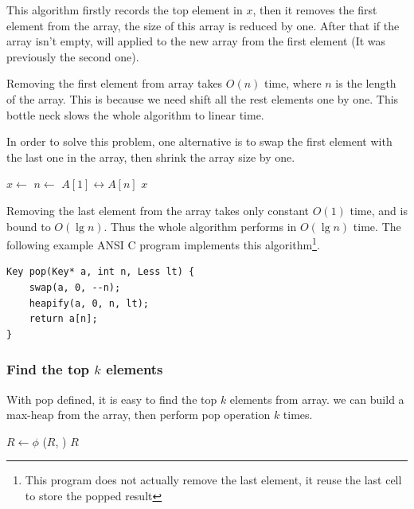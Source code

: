 \documentclass[b5paper]{article}
\begin{document}
This algorithm firstly records the top element in $x$, then
it removes the first element from the array, the size of
this array is reduced by one. After that if the array isn't
empty,  will applied to the new array from
the first element (It was previously the second one).

Removing the first element from array takes $O(n)$ time,
where $n$ is the length of the array. This is because
we need shift all the rest elements one by one.
This bottle neck slows the whole algorithm
to linear time.

In order to solve this problem, one alternative is
to swap the first element with the last one in the
array, then shrink the array size by one.

\begin{algorithmic}[1]
  \State $x \gets$ 
  \State $n \gets$ 
  \State {} $A[1] \leftrightarrow A[n]$
  \State {}
    \State {}
  \EndIf
  \State \Return $x$
\EndFunction
\end{algorithmic}

Removing the last element from the array takes
only constant $O(1)$ time, and  is bound to $O(\lg n)$.
Thus the whole algorithm performs in $O(\lg n)$ time. The following
example ANSI C program implements this algorithm\footnote{This program does not
actually remove the last element, it reuse the last cell to store the popped
result}.

\lstset{language=C}
\begin{lstlisting}
Key pop(Key* a, int n, Less lt) {
    swap(a, 0, --n);
    heapify(a, 0, n, lt);
    return a[n];
}
\end{lstlisting}

\subsubsection{Find the top $k$ elements}

With pop defined, it is easy to
find the top $k$ elements from array.
we can build a max-heap from the array, then perform
pop operation $k$ times.

\begin{algorithmic}[1]
  \State $R \gets \phi$
  \State {}
    \State {}($R$, )
  \EndFor
  \State \Return $R$
\EndFunction
\end{algorithmic}
\end{document}

